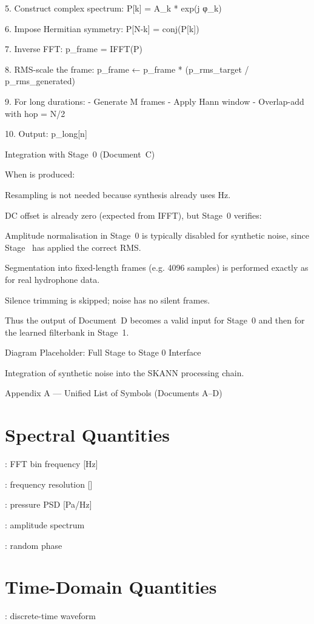 \documentclass[12pt]{article}
\begin{document}
5. Construct complex spectrum:
       P[k] = A_k * exp(j φ_k)

6. Impose Hermitian symmetry:
       P[N-k] = conj(P[k])

7. Inverse FFT:
       p_frame = IFFT(P)

8. RMS-scale the frame:
       p_frame ← p_frame * (p_rms_target / p_rms_generated)

9. For long durations:
       - Generate M frames
       - Apply Hann window
       - Overlap-add with hop = N/2

10. Output:
       p_long[n]

Integration with Stage 0 (Document C)

When  is produced:

Resampling is not needed because synthesis already uses  Hz.

DC offset is already zero (expected from IFFT), but Stage 0 verifies:


Amplitude normalisation in Stage 0 is typically disabled for synthetic noise, since Stage  has applied the correct RMS.

Segmentation into fixed-length frames (e.g. 4096 samples) is performed exactly as for real hydrophone data.

Silence trimming is skipped; noise has no silent frames.

Thus the output of Document D becomes a valid input for Stage 0 and then for the learned filterbank in Stage 1.

Diagram Placeholder: Full Stage  to Stage 0 Interface

Integration of synthetic noise into the SKANN processing chain.

Appendix A — Unified List of Symbols (Documents A–D)

\section*{Spectral Quantities}
: FFT bin frequency [Hz]

: frequency resolution []

: pressure PSD [Pa/Hz]

: amplitude spectrum

: random phase

\section*{Time-Domain Quantities}
: discrete-time waveform
\end{document}
